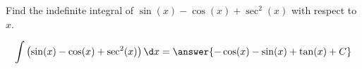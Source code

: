 \documentclass{ximera}
\author{Gregory Hartman \and Matthew Carr\and Nela Lakos}
\begin{document}
\begin{exercise}

Find the indefinite integral of $\sin(x)-\cos(x)+\sec^{2}(x)$ with respect to $x$.
\begin{prompt}
  \[
  \int \left(\sin(x)-\cos(x)+\sec^{2}(x)\right)\d x
  =\answer{-\cos(x)-\sin(x)+\tan(x)+C}
  \]
\end{prompt}
\end{exercise}
\end{document}
